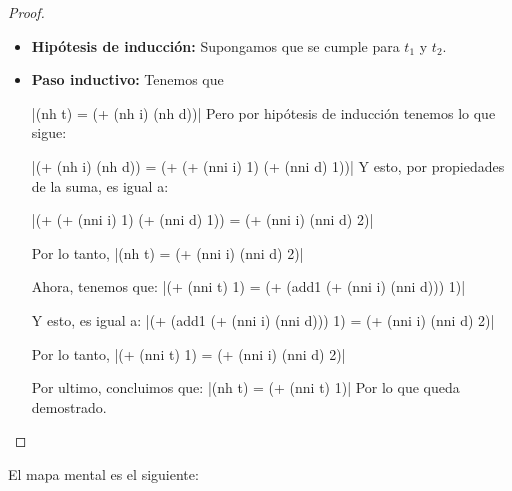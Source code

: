\documentclass[answers]{exam}
\begin{document}
\begin{questions}
\begin{solution}
\begin{parts}
\begin{proof}
\begin{itemize}
                |(nh (hoja a)) = 1 = (+ 0 1) = (+ (nni t) 1)|
                Por lo que queda demostrada la base de inducción.
          \item \textbf{Hipótesis de inducción:} Supongamos que se cumple para
                $t_{1}$ y $t_{2}$.
          \item \textbf{Paso inductivo:} Tenemos que

                |(nh t) = (+ (nh i) (nh d))| Pero por hipótesis de
                inducción tenemos lo que sigue:

                |(+ (nh i) (nh d)) = (+ (+ (nni i) 1) (+ (nni d) 1))|
                Y esto, por propiedades de la suma, es igual a:

                |(+ (+ (nni i) 1) (+ (nni d) 1)) = (+ (nni i) (nni d) 2)|

                Por lo tanto,
                |(nh t) = (+ (nni i) (nni d) 2)|

                Ahora, tenemos que:
                |(+ (nni t) 1) = (+ (add1 (+ (nni i) (nni d))) 1)|

                Y esto, es igual a:
                |(+ (add1 (+ (nni i) (nni d))) 1) = (+ (nni i) (nni d) 2)|

                Por lo tanto,
                |(+ (nni t) 1) = (+ (nni i) (nni d) 2)|

                Por ultimo, concluimos que:
                |(nh t) = (+ (nni t) 1)|
                Por lo que queda demostrado.
        \end{itemize}
      \end{proof}
    \end{parts}
  \end{solution}

  \newpage{}

  \begin{solution}
    El mapa mental es el siguiente:


\end{solution}
\end{questions}
\end{document}
